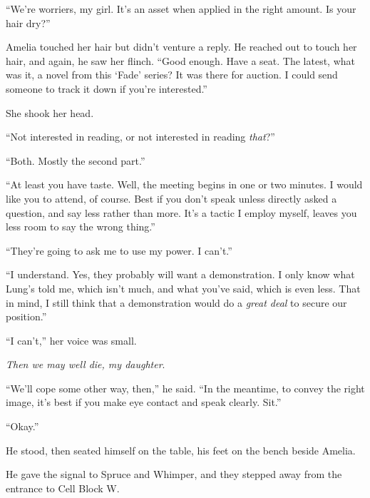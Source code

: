 ``We're worriers, my girl.  It's an asset when applied in the right amount.  Is your hair dry?''



Amelia touched her hair but didn't venture a reply.  He reached out to touch her hair, and again, he saw her flinch.  ``Good enough.  Have a seat.  The latest, what was it, a novel from this `Fade' series?  It was there for auction.  I could send someone to track it down if you're interested.''



She shook her head.



``Not interested in reading, or not interested in reading \emph{that}?''



``Both.  Mostly the second part.''



``At least you have taste.  Well, the meeting begins in one or two minutes.  I would like you to attend, of course.  Best if you don't speak unless directly asked a question, and say less rather than more.  It's a tactic I employ myself, leaves you less room to say the wrong thing.''



``They're going to ask me to use my power.  I can't.''



``I understand.  Yes, they probably will want a demonstration.  I only know what Lung's told me, which isn't much, and what you've said, which is even less.  That in mind, I still think that a demonstration would do a \emph{great deal} to secure our position.''



``I can't,'' her voice was small.



\emph{Then we may well die, my daughter}.



``We'll cope some other way, then,'' he said.  ``In the meantime, to convey the right image, it's best if you make eye contact and speak clearly.  Sit.''



``Okay.''



He stood, then seated himself on the table, his feet on the bench beside Amelia.



He gave the signal to Spruce and Whimper, and they stepped away from the entrance to Cell Block W.



